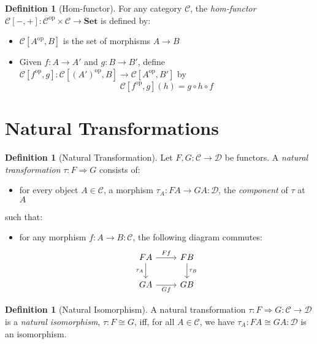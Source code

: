 \documentclass{book}
\theoremstyle{definition}
\newtheorem{df}[lm]{Definition}
\newcommand{\Set}{\ensuremath{\mathbf{Set}}}
\begin{document}
  \begin{df}[Hom-functor]
    For any category $\mathcal{C}$, the \emph{hom-functor} $\mathcal{C}[-, +] : 
    \mathcal{C}^{\mathrm{op}} \times \mathcal{C} \rightarrow \Set$ is defined 
    by:
    \begin{itemize}
      \item $\mathcal{C}[A^{\mathrm{op}}, B]$ is the set of morphisms $A 
      \rightarrow 
      B$
      \item Given $f : A \rightarrow A'$ and $g : B \rightarrow B'$, define 
      $\mathcal{C}[f^{\mathrm{op}}, g] : \mathcal{C}[(A')^{\mathrm{op}}, B] 
      \rightarrow \mathcal{C}[A^{\mathrm{op}}, B']$ by
      \[ \mathcal{C}[f^{\mathrm{op}}, g](h) = g \circ h \circ f \]
    \end{itemize}
  \end{df}
  
  \section{Natural Transformations}
  
  \begin{df}[Natural Transformation]
    Let $F, G : \mathcal{C} \rightarrow \mathcal{D}$ be functors. A 
    \emph{natural 
      transformation} $\tau : F \Rightarrow G$ consists of:
    \begin{itemize}
      \item for every object $A \in \mathcal{C}$, a morphism $\tau_A : FA 
      \rightarrow G A : \mathcal{D}$, the \emph{component} of $\tau$ at $A$
    \end{itemize}
    such that:
    \begin{itemize}
      \item for any morphism $f : A \rightarrow B : \mathcal{C}$, the following 
      diagram commutes:
      \[ \begin{tikzcd}
        FA \ar[r, "Ff"] \ar[d, "\tau_A"'] & FB \ar[d, "\tau_B"] \\
        GA \ar[r, "Gf"'] & GB
      \end{tikzcd} \]
    \end{itemize}
  \end{df}
  
  \begin{df}[Natural Isomorphism]
    A natural transformation $\tau : F \Rightarrow G : \mathcal{C} \rightarrow 
    \mathcal{D}$ is a \emph{natural isomorphism}, $\tau : F \cong G$, iff, for 
    all 
    $A \in \mathcal{C}$, we have $\tau_A : FA \cong GA : \mathcal{D}$ is an 
    isomorphism.
  \end{df}
  
\end{document}
